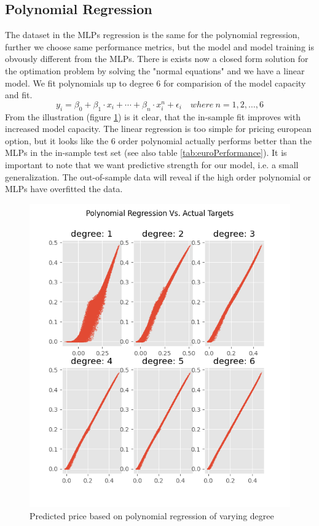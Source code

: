 \subsection{Polynomial Regression}
The dataset in the MLPs regression is the same for the polynomial regression, further we choose same performance metrics, but the model and model training is obvously different from the MLPs. There is exists now a closed form solution for the optimation problem by solving the "normal equations" and we have a linear model. We fit polynomials up to degree 6 for comparision of the model capacity and fit.  
$$y_i=\beta_0 + \beta_1 \cdot x_i + \cdots + \beta_n \cdot x_i^n + \epsilon_i \quad where \ n=1,2,\ldots,6$$
From the illustration (figure \ref{fig:PolynomialEuroC}) is it clear, that the in-sample fit improves with increased model capacity. The linear regression is too simple for pricing european option, but it looks like the 6 order polynomial actually performs better than the MLPs in the in-sample test set (see also table \ref{tab:euroPerformance}). It is important to note that we want predictive strength for our model, i.e. a small generalization. The out-of-sample data will reveal if the high order polynomial or MLPs have overfitted the data.
\begin{figure}[H]
\centering
\includegraphics{Figures/polynomialEuroC.png}
\decoRule
\caption[Polynomial Regression Predictions Vs. Actual Prices]{Predicted price based on polynomial regression of varying degree}
\label{fig:PolynomialEuroC}
\end{figure}

